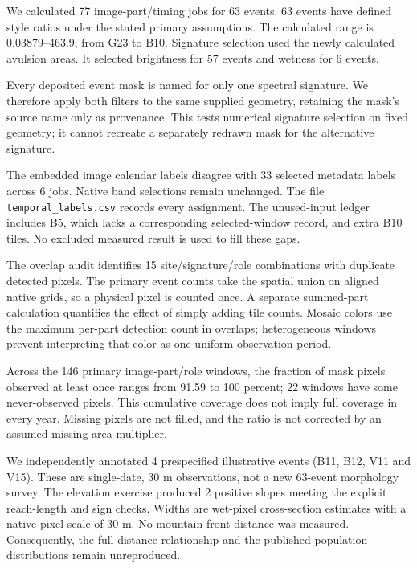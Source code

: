 We calculated 77 image-part/timing jobs for 63 events.
63 events have defined style ratios under the stated primary assumptions.
The calculated range is 0.03879--463.9, from G23
to B10. Signature selection used the newly calculated avulsion
areas. It selected brightness for 57 events and
wetness for 6 events.

Every deposited event mask is named for only one spectral signature. We therefore
apply both filters to the same supplied geometry, retaining the mask's source name
only as provenance. This tests numerical signature selection on fixed geometry;
it cannot recreate a separately redrawn mask for the alternative signature.

The embedded image calendar labels disagree with 33 selected metadata
labels across 6 jobs. Native band selections
remain unchanged. The file \texttt{temporal\_labels.csv} records every assignment.
The unused-input ledger includes B5, which lacks a corresponding selected-window
record, and extra B10 tiles. No excluded measured result is used to fill these gaps.

The overlap audit identifies 15 site/signature/role combinations with
duplicate detected pixels. The primary event counts take the spatial union on
aligned native grids, so a physical pixel is counted once. A separate summed-part
calculation quantifies the effect of simply adding tile counts. Mosaic colors use
the maximum per-part detection count in overlaps; heterogeneous windows prevent
interpreting that color as one uniform observation period.

Across the 146 primary image-part/role windows, the fraction of
mask pixels observed at least once ranges from 91.59 to 100 percent;
22 windows have some never-observed pixels. This cumulative
coverage does not imply full coverage in every year. Missing pixels are not
filled, and the ratio is not corrected by an assumed missing-area multiplier.

We independently annotated 4 prespecified illustrative events
(B11, B12, V11 and V15). These are single-date, 30 m observations, not a new
63-event morphology survey. The elevation exercise produced 2 positive
slopes meeting the explicit reach-length and sign checks. Widths are wet-pixel
cross-section estimates with a native pixel scale of 30 m. No mountain-front
distance was measured. Consequently, the full distance relationship and the
published population distributions remain unreproduced.
